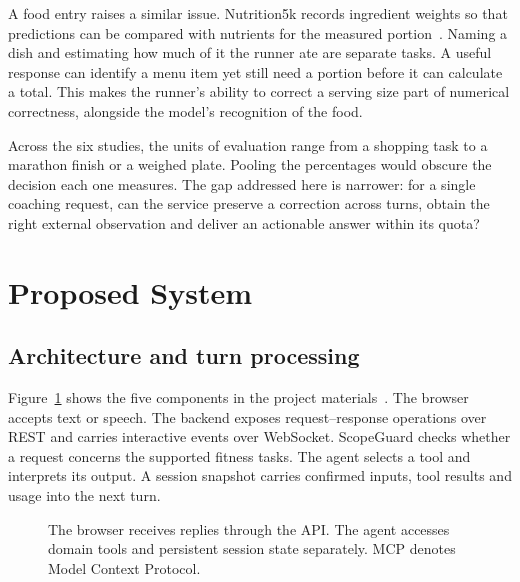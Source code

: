 \documentclass[conference]{IEEEtran}
\begin{document}
A food entry raises a similar issue. Nutrition5k records ingredient weights so that predictions can be compared with nutrients for the measured portion~\cite{nutri}. Naming a dish and estimating how much of it the runner ate are separate tasks. A useful response can identify a menu item yet still need a portion before it can calculate a total. This makes the runner's ability to correct a serving size part of numerical correctness, alongside the model's recognition of the food.

Across the six studies, the units of evaluation range from a shopping task to a marathon finish or a weighed plate. Pooling the percentages would obscure the decision each one measures. The gap addressed here is narrower: for a single coaching request, can the service preserve a correction across turns, obtain the right external observation and deliver an actionable answer within its quota?

\section{Proposed System}
\subsection{Architecture and turn processing}
Figure~\ref{fig:arch} shows the five components in the project materials~\cite{project}. The browser accepts text or speech. The backend exposes request--response operations over REST and carries interactive events over WebSocket. ScopeGuard checks whether a request concerns the supported fitness tasks. The agent selects a tool and interprets its output. A session snapshot carries confirmed inputs, tool results and usage into the next turn.

\begin{figure}[htbp]\centering
{}
\caption{The browser receives replies through the API. The agent accesses domain tools and persistent session state separately. MCP denotes Model Context Protocol.}\label{fig:arch}
\end{figure}
\end{document}
